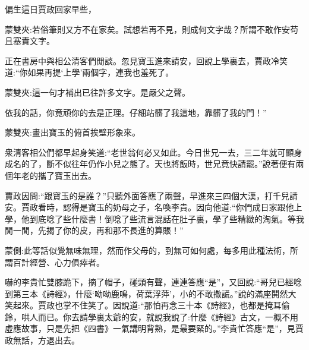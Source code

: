 \begin{parag}
    偏生這日賈政回家早些，\begin{note}蒙雙夾:若俗筆則又方不在家矣。試想若再不見，則成何文字哉？所謂不敢作安苟且塞責文字。\end{note}正在書房中與相公清客們閒談。忽見寶玉進來請安，回說上學裏去，賈政冷笑道:“你如果再提‘上學’兩個字，連我也羞死了。\begin{note}蒙雙夾:這一句才補出已往許多文字。是嚴父之聲。\end{note}依我的話，你竟頑你的去是正理。仔細站髒了我這地，靠髒了我的門！”\begin{note}蒙雙夾:畫出寶玉的俯首挨壁形象來。\end{note}衆清客相公們都早起身笑道:“老世翁何必又如此。今日世兄一去，三二年就可顯身成名的了，斷不似往年仍作小兒之態了。天也將飯時，世兄竟快請罷。”說著便有兩個年老的攜了寶玉出去。
\end{parag}


\begin{parag}
    賈政因問:“跟寶玉的是誰？”只聽外面答應了兩聲，早進來三四個大漢，打千兒請安。賈政看時，認得是寶玉的奶母之子，名喚李貴。因向他道:“你們成日家跟他上學，他到底唸了些什麼書！倒唸了些流言混話在肚子裏，學了些精緻的淘氣。等我閒一閒，先揭了你的皮，再和那不長進的算賬！”\begin{note}蒙側:此等話似覺無味無理，然而作父母的，到無可如何處，每多用此種法術，所謂百計經營、心力俱瘁者。\end{note}嚇的李貴忙雙膝跪下，摘了帽子，碰頭有聲，連連答應“是”，又回說:“哥兒已經唸到第三本《詩經》，什麼‘呦呦鹿鳴，荷葉浮萍’，小的不敢撒謊。”說的滿座鬨然大笑起來。賈政也掌不住笑了。因說道:“那怕再念三十本《詩經》，也都是掩耳偷鈴，哄人而已。你去請學裏太爺的安，就說我說了:什麼《詩經》古文，一概不用虛應故事，只是先把《四書》一氣講明背熟，是最要緊的。”李貴忙答應“是”，見賈政無話，方退出去。
\end{parag}


